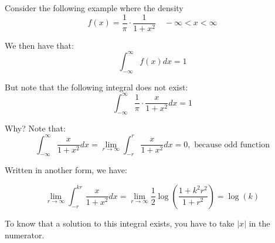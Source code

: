 \documentclass{article}
\begin{document}
    Consider the following example where the density
    \begin{equation*}
        f(x) = \frac{1}{\pi} \cdot \frac{1}{1+x^2} \quad -\infty < x < \infty
    \end{equation*}
    
    \noindent We then have that:
    \begin{equation*}
        \int_{-\infty}^\infty f(x) dx = 1
    \end{equation*}
    
    \noindent But note that the following integral does not exist:
    \begin{equation*}
        \int_{-\infty}^\infty \frac{1}{\pi} \cdot \frac{x}{1+x^2} dx = 1
    \end{equation*}
    
    \noindent Why? Note that:
    \begin{equation*}
        \int_{-\infty}^\infty \frac{x}{1+x^2} dx = \lim_{r\to\infty} \int_{-r}^r \frac{x}{1+x^2} dx = 0, \text{ because odd function}
    \end{equation*}
        
    Written in another form, we have:
    
    \begin{equation*}
        \lim_{r\to\infty} \int_{-r}^{kr} \frac{x}{1+x^2} dx = \lim_{r\to\infty} \frac{1}{2}\log\left(\frac{1+k^2r^2}{1+r^2} \right) = \log (k)
    \end{equation*}
    
    To know that a solution to this integral exists, you have to take $|x|$ in the numerator.
    
\end{document}

